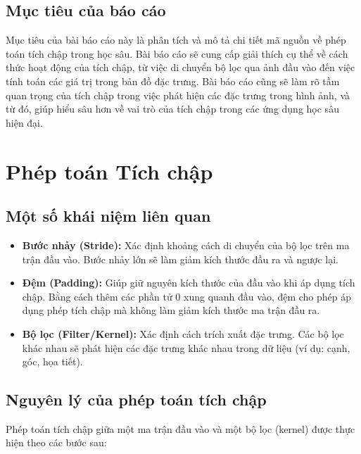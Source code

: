 \documentclass{article}
\begin{document}
\subsection{Mục tiêu của báo cáo}
\large
\hspace{0.4cm} Mục tiêu của bài báo cáo này là phân tích và mô tả chi tiết mã nguồn về phép toán tích chập trong học sâu. Bài báo cáo sẽ cung cấp giải thích cụ thể về cách thức hoạt động của tích chập, từ việc di chuyển bộ lọc qua ảnh đầu vào đến việc tính toán các giá trị trong bản đồ đặc trưng. Bài báo cáo cũng sẽ làm rõ tầm quan trọng của tích chập trong việc phát hiện các đặc trưng trong hình ảnh, và từ đó, giúp hiểu sâu hơn về vai trò của tích chập trong các ứng dụng học sâu hiện đại. 
\newpage
\section*{Phép toán Tích chập}
\setcounter{section}{1}\setlength{\baselineskip}{15pt}
\setcounter{subsection}{0}
\setcounter{subsubsection}{0}
\large
\subsection{Một số khái niệm liên quan}
\begin{itemize}[label=$\square$]
	\item \textbf{Bước nhảy (Stride):} Xác định khoảng cách di chuyển của bộ lọc trên ma trận đầu vào. Bước nhảy lớn sẽ làm giảm kích thước đầu ra và ngược lại.
	\item \textbf{Đệm (Padding):} Giúp giữ nguyên kích thước của đầu vào khi áp dụng tích chập. Bằng cách thêm các phần tử 0 xung quanh đầu vào, đệm cho phép áp dụng phép tích chập mà không làm giảm kích thước ma trận đầu ra.
	\item \textbf{Bộ lọc (Filter/Kernel):} Xác định cách trích xuất đặc trưng. Các bộ lọc khác nhau sẽ phát hiện các đặc trưng khác nhau trong dữ liệu (ví dụ: cạnh, góc, họa tiết).
\end{itemize}
\subsection{Nguyên lý của phép toán tích chập}
\hspace{0.4cm} Phép toán tích chập giữa một ma trận đầu vào và một bộ lọc (kernel) được thực hiện theo các bước sau:
\end{document}
